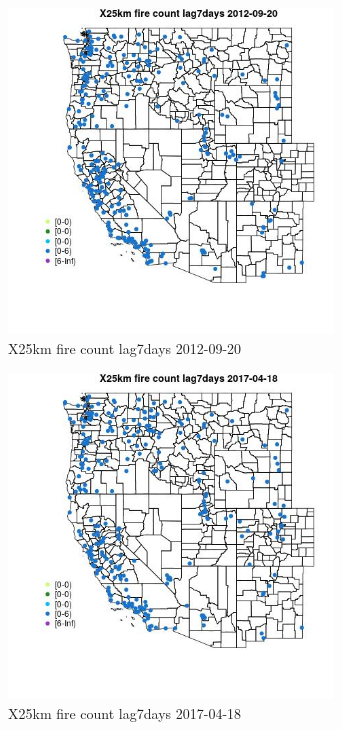 \begin{figure} 
\centering  
\includegraphics[width=0.77\textwidth]{Code_Outputs/Report_ML_input_PM25_Step4_part_e_de_duplicated_aves_compiled_2019-05-14wNAs_MapObsX25km_fire_count_lag7days2012-09-20.jpg} 
\caption{\label{fig:Report_ML_input_PM25_Step4_part_e_de_duplicated_aves_compiled_2019-05-14wNAsMapObsX25km_fire_count_lag7days2012-09-20}X25km fire count lag7days 2012-09-20} 
\end{figure} 
 

\begin{figure} 
\centering  
\includegraphics[width=0.77\textwidth]{Code_Outputs/Report_ML_input_PM25_Step4_part_e_de_duplicated_aves_compiled_2019-05-14wNAs_MapObsX25km_fire_count_lag7days2017-04-18.jpg} 
\caption{\label{fig:Report_ML_input_PM25_Step4_part_e_de_duplicated_aves_compiled_2019-05-14wNAsMapObsX25km_fire_count_lag7days2017-04-18}X25km fire count lag7days 2017-04-18} 
\end{figure} 
 

